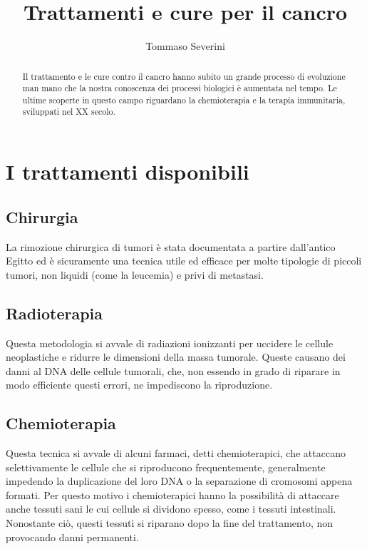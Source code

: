 \documentclass[11pt]{article}
\title{Trattamenti e cure per il cancro}
\author{Tommaso Severini}
\date{}
\begin{document}
	
	\maketitle
	
	\begin{abstract}

Il trattamento e le cure contro il cancro hanno subito un grande processo di evoluzione man mano che la nostra conoscenza dei processi biologici è aumentata nel tempo. Le ultime scoperte in questo campo riguardano la chemioterapia e la terapia immunitaria, sviluppati nel XX secolo. 

	\end{abstract}


	


\section*{I trattamenti disponibili}

\subsection*{Chirurgia}

La rimozione chirurgica di tumori è stata documentata a partire dall'antico  Egitto ed è sicuramente una tecnica utile ed efficace per molte tipologie di piccoli tumori, non liquidi (come la leucemia) e privi di metastasi.



\subsection*{Radioterapia}

Questa metodologia si avvale di radiazioni ionizzanti per uccidere le cellule neoplastiche e ridurre le dimensioni della massa tumorale. Queste causano dei danni al DNA delle cellule tumorali, che, non essendo in grado di riparare in modo efficiente questi errori, ne impediscono la riproduzione.

\subsection*{Chemioterapia}

Questa tecnica si avvale di alcuni farmaci, detti chemioterapici, che attaccano selettivamente le cellule che si riproducono frequentemente, generalmente impedendo la duplicazione del loro DNA o la separazione di cromosomi appena formati. Per questo motivo i chemioterapici hanno la possibilità di attaccare anche tessuti sani le cui cellule si dividono spesso, come i tessuti intestinali. Nonostante ciò, questi tessuti si riparano dopo la fine del trattamento, non provocando danni permanenti.
\end{document}
